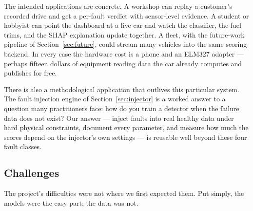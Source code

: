 The intended applications are concrete. A workshop can replay a customer's
recorded drive and get a per-fault verdict with sensor-level evidence. A
student or hobbyist can point the dashboard at a live car and watch the
classifier, the fuel trims, and the SHAP explanation update together. A
fleet, with the future-work pipeline of Section~\ref{sec:future}, could
stream many vehicles into the same scoring backend. In every case the
hardware cost is a phone and an ELM327 adapter --- perhaps fifteen dollars
of equipment reading data the car already computes and publishes for free.

There is also a methodological application that outlives this particular
system. The fault injection engine of Section~\ref{sec:injector} is a
worked answer to a question many practitioners face: how do you train a
detector when the failure data does not exist? Our answer --- inject faults
into real healthy data under hard physical constraints, document every
parameter, and measure how much the scores depend on the injector's own
settings --- is reusable well beyond these four fault classes.

\subsection{Challenges}

The project's difficulties were not where we first expected them. Put
simply, the models were the easy part; the data was not.

